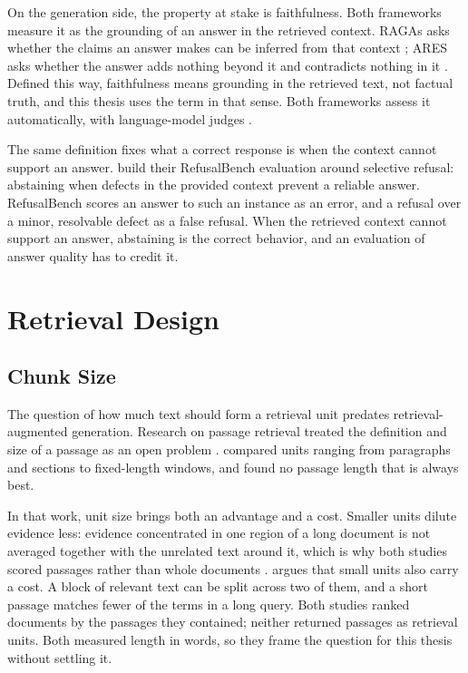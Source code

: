 On the generation side, the property at stake is faithfulness. Both frameworks
measure it as the grounding of an answer in the retrieved context. RAGAs asks
whether the claims an answer makes can be inferred from that context
\parencite{es2024}; ARES asks whether the answer adds nothing beyond it and
contradicts nothing in it \parencite{saad-falcon2024}. Defined this way,
faithfulness means grounding in the retrieved text, not factual truth, and this
thesis uses the term in that sense. Both frameworks assess it automatically, with
language-model judges \parencite{es2024,saad-falcon2024}.

The same definition fixes what a correct response is when the context cannot
support an answer. \textcite{muhamed2026} build their RefusalBench evaluation
around selective refusal: abstaining when defects in the provided context prevent
a reliable answer. RefusalBench scores an answer to such an instance as an error,
and a refusal over a minor, resolvable defect as a false refusal. When the
retrieved context cannot support an answer, abstaining is the correct behavior, and an
evaluation of answer quality has to credit it.

\section{Retrieval Design}

\subsection{Chunk Size}

The question of how much text should form a retrieval unit predates
retrieval-augmented generation. Research on passage retrieval treated the
definition and size of a passage as an open problem \parencite{callan1994}.
\textcite{kaszkiel1997} compared units ranging from paragraphs and sections to
fixed-length windows, and found no passage length that is always best.

In that work, unit size brings both an advantage and a cost. Smaller units dilute
evidence less: evidence concentrated in one region of a long document is not
averaged together with the unrelated text around it, which is why both studies
scored passages rather than whole documents \parencite{callan1994,kaszkiel1997}.
\textcite{callan1994} argues that small units also carry a cost. A block of
relevant text can be split across two of them, and a short passage matches fewer
of the terms in a long query. Both studies ranked documents by the passages they
contained; neither returned passages as retrieval units. Both measured length
in words, so they frame the question for this thesis without settling it.

